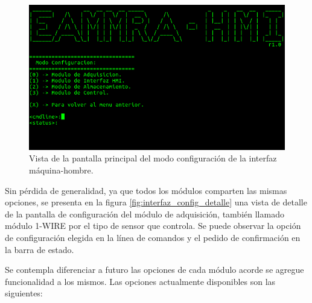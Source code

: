 \begin{figure}[htpb]
	\centering
	\includegraphics[width=\textwidth]{./Figures/interfaz_config.png}
	\caption[]{Vista de la pantalla principal del modo configuración de la interfaz máquina-hombre.}
	\label{fig:interfaz_config}
\end{figure}

Sin pérdida de generalidad, ya que todos los módulos comparten las mismas opciones, se presenta en la figura \ref{fig:interfaz_config_detalle} una vista de detalle de la pantalla de configuración del módulo de adquisición, también llamado módulo 1-WIRE por el tipo de sensor que controla. Se puede observar la opción de configuración elegida en la línea de comandos y el pedido de confirmación en la barra de estado.

Se contempla diferenciar a futuro las opciones de cada módulo acorde se agregue funcionalidad a los mismos. Las opciones actualmente disponibles son las siguientes:

